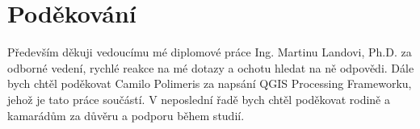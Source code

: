\vfill

\vglue 14cm

\section*{Poděkování}
\indent\indent Především děkuji vedoucímu mé diplomové práce Ing. Martinu Landovi, Ph.D. za odborné vedení, rychlé reakce na mé dotazy a ochotu hledat na ně odpovědi. Dále bych chtěl poděkovat Camilo Polimeris za napsání QGIS Processing Frameworku, jehož je tato práce součástí. V neposlední řadě bych chtěl poděkovat rodině a kamarádům za důvěru a podporu během studií.